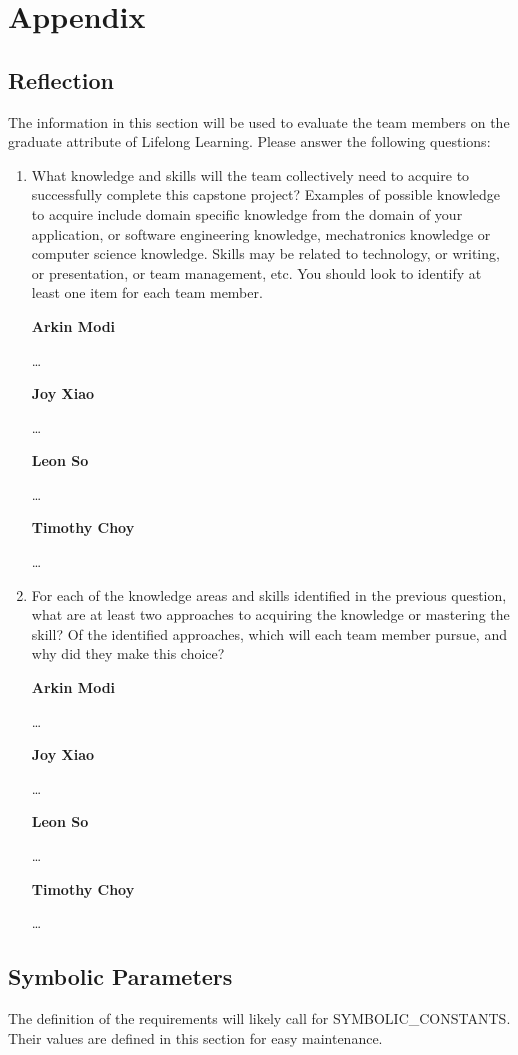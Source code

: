 \documentclass[12pt]{article}
\begin{document}
\section{Appendix}


\subsection{Reflection}

The information in this section will be used to evaluate the team members on the graduate attribute
of Lifelong Learning. Please answer the following questions:

\begin{enumerate}
	\item What knowledge and skills will the team collectively need to acquire to successfully complete this
	      capstone project? Examples of possible knowledge to acquire include domain specific knowledge from
	      the domain of your application, or software engineering knowledge, mechatronics knowledge or
	      computer science knowledge. Skills may be related to technology, or writing, or presentation, or
	      team management, etc. You should look to identify at least one item for each team member.

	      \textbf{Arkin Modi}

	      \dots

	      \textbf{Joy Xiao}

	      \dots

	      \textbf{Leon So}

	      \dots

	      \textbf{Timothy Choy}

	      \dots

	\item For each of the knowledge areas and skills identified in the previous question, what are at least
	      two approaches to acquiring the knowledge or mastering the skill? Of the identified approaches,
	      which will each team member pursue, and why did they make this choice?

	      \textbf{Arkin Modi}

	      \dots

	      \textbf{Joy Xiao}

	      \dots

	      \textbf{Leon So}

	      \dots

	      \textbf{Timothy Choy}

	      \dots

\end{enumerate}

\subsection{Symbolic Parameters}

The definition of the requirements will likely call for SYMBOLIC\_CONSTANTS. Their values are
defined in this section for easy maintenance.
\end{document}
